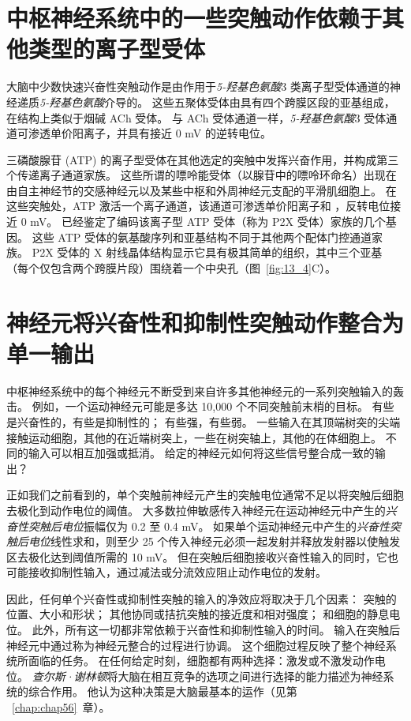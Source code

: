 \section{中枢神经系统中的一些突触动作依赖于其他类型的离子型受体}

大脑中少数快速兴奋性突触动作是由作用于\textit{5-羟基色氨酸}3 类离子型受体通道的神经递质\textit{5-羟基色氨酸}介导的。
这些五聚体受体由具有四个跨膜区段的亚基组成，在结构上类似于烟碱 ACh 受体。
与 ACh 受体通道一样，\textit{5-羟基色氨酸}3 受体通道可渗透单价阳离子，并具有接近 0 mV 的逆转电位。


三磷酸腺苷 (ATP) 的离子型受体在其他选定的突触中发挥兴奋作用，并构成第三个传递离子通道家族。
这些所谓的嘌呤能受体（以腺苷中的嘌呤环命名）出现在由自主神经节的交感神经元以及某些中枢和外周神经元支配的平滑肌细胞上。
在这些突触处，ATP 激活一个离子通道，该通道可渗透单价阳离子和 ，反转电位接近 0 mV。
已经鉴定了编码该离子型 ATP 受体（称为 P2X 受体）家族的几个基因。
这些 ATP 受体的氨基酸序列和亚基结构不同于其他两个配体门控通道家族。
P2X 受体的 X 射线晶体结构显示它具有极其简单的组织，其中三个亚基（每个仅包含两个跨膜片段）围绕着一个中央孔（图~\ref{fig:13_4}C）。



\section{神经元将兴奋性和抑制性突触动作整合为单一输出}

中枢神经系统中的每个神经元不断受到来自许多其他神经元的一系列突触输入的轰击。
例如，一个运动神经元可能是多达 10,000 个不同突触前末梢的目标。
有些是兴奋性的，有些是抑制性的；
有些强，有些弱。
一些输入在其顶端树突的尖端接触运动细胞，其他的在近端树突上，一些在树突轴上，其他的在体细胞上。
不同的输入可以相互加强或抵消。
给定的神经元如何将这些信号整合成一致的输出？


正如我们之前看到的，单个突触前神经元产生的突触电位通常不足以将突触后细胞去极化到动作电位的阈值。
大多数拉伸敏感传入神经元在运动神经元中产生的\textit{兴奋性突触后电位}振幅仅为 0.2 至 0.4 mV。
如果单个运动神经元中产生的\textit{兴奋性突触后电位}线性求和，则至少 25 个传入神经元必须一起发射并释放发射器以使触发区去极化达到阈值所需的 10 mV。
但在突触后细胞接收兴奋性输入的同时，它也可能接收抑制性输入，通过减法或分流效应阻止动作电位的发射。


因此，任何单个兴奋性或抑制性突触的输入的净效应将取决于几个因素：
突触的位置、大小和形状；
其他协同或拮抗突触的接近度和相对强度；
和细胞的静息电位。 
此外，所有这一切都非常依赖于兴奋性和抑制性输入的时间。
输入在突触后神经元中通过称为神经元整合的过程进行协调。
这个细胞过程反映了整个神经系统所面临的任务。
在任何给定时刻，细胞都有两种选择：激发或不激发动作电位。
\textit{查尔斯·谢林顿}将大脑在相互竞争的选项之间进行选择的能力描述为神经系统的综合作用。
他认为这种决策是大脑最基本的运作（见第 ~\ref{chap:chap56}~章）。



